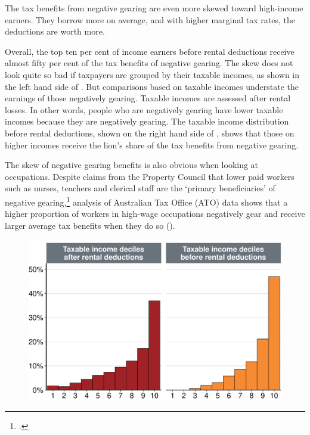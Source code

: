 The tax benefits from negative gearing are even more skewed toward high-income earners. They borrow more on average, and with higher marginal tax rates, the deductions are worth more. 



Overall, the top ten per cent of income earners before rental deductions receive almost fifty per cent of the tax benefits of negative gearing. 
The skew does not look quite so bad if taxpayers are grouped by their taxable incomes, as shown in the left hand side of . But comparisons based on taxable incomes understate the earnings of those negatively gearing. 
Taxable incomes are assessed after rental losses. 
In other words, people who are negatively gearing have lower taxable incomes because they are negatively gearing. 
The taxable income distribution before rental deductions, shown on the right hand side of , shows that those on higher incomes receive the lion’s share of the tax benefits from negative gearing. 

The skew of negative gearing benefits is also obvious when looking at occupations. Despite claims from the Property Council that lower paid workers such as nurses, teachers and clerical staff are the ‘primary beneficiaries’ of negative gearing,\footcite{PropertyCouncilAustralia2015WhoReallyUsesNG} analysis of Australian Tax Office (ATO) data shows that a higher proportion of workers in high-wage occupations negatively gear and receive larger average tax benefits when they do so ().
\begin{figure}
\includegraphics[width=\columnwidth]{CGT-NG-atlas//Benefit-NG-before-after-deductions-1}

\end{figure}

